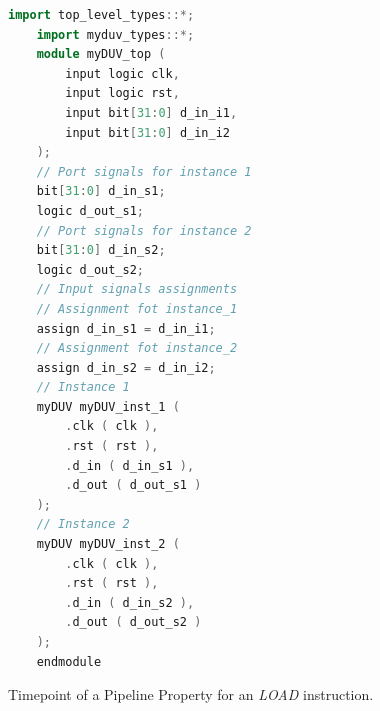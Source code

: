 \begin{figure}[htb!]
    \begin{lstlisting}[language=c++]
    import top_level_types::*;
    import myduv_types::*;
    module myDUV_top (
        input logic clk,
        input logic rst,
        input bit[31:0] d_in_i1,
        input bit[31:0] d_in_i2
    );
    // Port signals for instance 1
    bit[31:0] d_in_s1;
    logic d_out_s1;
    // Port signals for instance 2
    bit[31:0] d_in_s2;
    logic d_out_s2;
    // Input signals assignments
    // Assignment fot instance_1
    assign d_in_s1 = d_in_i1;
    // Assignment fot instance_2
    assign d_in_s2 = d_in_i2;
    // Instance 1
    myDUV myDUV_inst_1 (
        .clk ( clk ),
        .rst ( rst ),
        .d_in ( d_in_s1 ),
        .d_out ( d_out_s1 )
    );
    // Instance 2
    myDUV myDUV_inst_2 (
        .clk ( clk ),
        .rst ( rst ),
        .d_in ( d_in_s2 ),
        .d_out ( d_out_s2 )
    );
    endmodule\end{lstlisting}
    \caption{Timepoint of a Pipeline Property for an \textit{LOAD} instruction.}
    \label{fig:s2qed-top-example}
\end{figure}

